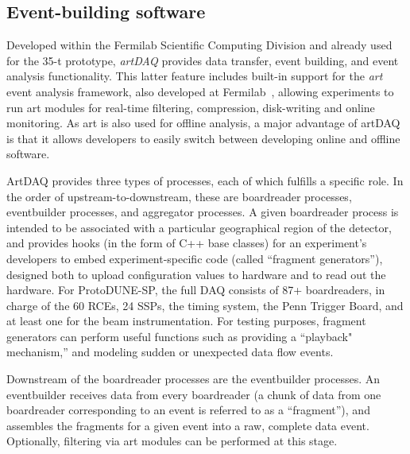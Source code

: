 \subsection{Event-building software }
\label{sec:daq-ev-build}

Developed within the Fermilab Scientific Computing Division and
already used for the 35-t prototype, \textit{artDAQ} provides data
transfer, event building, and event analysis functionality. This
latter feature includes built-in support for the \textit{art} event analysis
framework,
also developed at Fermilab~\cite{fnal:art}, allowing experiments to run art modules for real-time
filtering, compression, disk-writing and online monitoring. As art is also used for offline analysis, a major
advantage of artDAQ is that it allows developers to easily switch
between developing online and offline software.

ArtDAQ provides three types of processes, each of which
fulfills a specific role. In the order of upstream-to-downstream, these
are boardreader processes, eventbuilder processes, and aggregator
processes. A given boardreader process is intended to be associated 
with a particular geographical region of the detector, and provides
hooks (in the form of C++ base classes) for an experiment's developers
to embed experiment-specific code (called ``fragment generators''),
designed both to upload configuration values to hardware and to read
out the hardware. For ProtoDUNE-SP, the full DAQ consists of 87+ 
boardreaders, in charge of the 60 RCEs, 24 SSPs, the timing system, 
the Penn Trigger Board, and at least one for the beam instrumentation.
For testing purposes, fragment generators can perform useful
functions such as providing a ``playback" mechanism,'' and modeling sudden or unexpected data flow events.

Downstream of the boardreader processes are the eventbuilder
processes. An eventbuilder receives data from every boardreader (a
chunk of data from one boardreader corresponding to an event is
referred to as a ``fragment''), and assembles the fragments for a given
event into a raw, complete data event. Optionally, filtering via art
modules can be performed at this stage.

